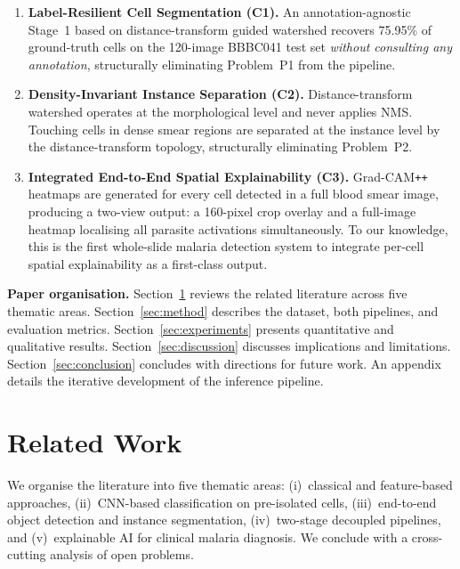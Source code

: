 \documentclass[10pt,twocolumn]{article}
\begin{document}
\begin{enumerate}[leftmargin=*, label=\textbf{C\arabic*.}]
  \item \textbf{Label-Resilient Cell Segmentation (C1).}
    An annotation-agnostic Stage~1 based on distance-transform guided
    watershed recovers 75.95\% of ground-truth cells on the 120-image
    BBBC041 test set \emph{without consulting any annotation}, structurally
    eliminating Problem~P1 from the pipeline.

  \item \textbf{Density-Invariant Instance Separation (C2).}
    Distance-transform watershed operates at the morphological level
    and never applies NMS. Touching cells in dense smear regions are
    separated at the instance level by the distance-transform topology,
    structurally eliminating Problem~P2.

  \item \textbf{Integrated End-to-End Spatial Explainability (C3).}
    Grad-CAM\texttt{++} heatmaps are generated for every cell detected
    in a full blood smear image, producing a two-view output: a 160-pixel
    crop overlay and a full-image heatmap localising all parasite
    activations simultaneously. To our knowledge, this is the first
    whole-slide malaria detection system to integrate per-cell spatial
    explainability as a first-class output.
\end{enumerate}

\medskip
\noindent\textbf{Paper organisation.}
Section~\ref{sec:related} reviews the related literature across five thematic
areas. Section~\ref{sec:method} describes the dataset, both pipelines, and
evaluation metrics. Section~\ref{sec:experiments} presents quantitative and
qualitative results. Section~\ref{sec:discussion} discusses implications and
limitations. Section~\ref{sec:conclusion} concludes with directions for future
work. An appendix details the iterative development of the inference pipeline.

\section{Related Work}
\label{sec:related}

We organise the literature into five thematic areas: (i)~classical and
feature-based approaches, (ii)~CNN-based classification on pre-isolated
cells, (iii)~end-to-end object detection and instance segmentation,
(iv)~two-stage decoupled pipelines, and (v)~explainable AI for clinical
malaria diagnosis. We conclude with a cross-cutting analysis of open
problems.
\end{document}
